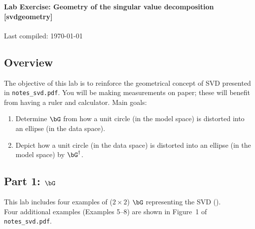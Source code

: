 \documentclass[11pt,titlepage,fleqn]{article}
\newcommand{\nfile}{{\tt notes\_svd.pdf}}
\begin{document}

\begin{spacing}{1.2}
\centering
{\large \bf Lab Exercise: Geometry of the singular value decomposition [svdgeometry]} \\
\cltag\ \\
Last compiled: \today
\end{spacing}



\subsection*{Overview}

The objective of this lab is to reinforce the geometrical concept of SVD \citep{TrefethenBau} presented in \nfile. You will be making measurements on paper; these will benefit from having a ruler and calculator. Main goals:
%
\begin{enumerate}
\item Determine $\bG$ from how a unit circle (in the model space) is distorted into an ellipse (in the data space).
\item Depict how a unit circle (in the data space) is distorted into an ellipse (in the model space) by $\bG^{\dagger}$.
\end{enumerate}


\subsection*{Part 1: $\bG$}

This lab includes four examples of ($2 \times 2$) $\bG$ representing the SVD (). \\
Four additional examples (Examples 5--8) are shown in Figure~1 of \nfile.
\end{document}
